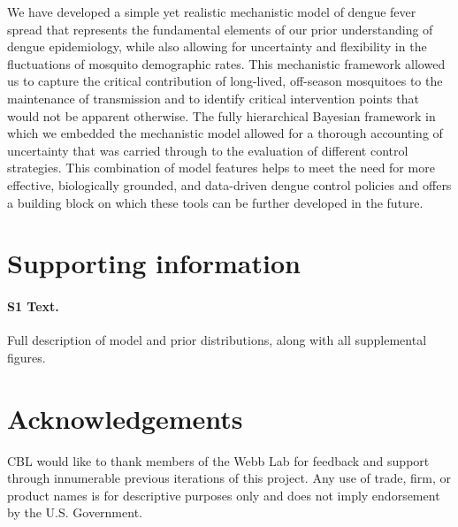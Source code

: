 \documentclass[10pt,letterpaper]{article}
\begin{document}
We have developed a simple yet realistic mechanistic model of dengue fever spread that represents the fundamental elements of our prior understanding of dengue epidemiology, while also allowing for uncertainty and flexibility in the fluctuations of mosquito demographic rates.
This mechanistic framework allowed us to capture the critical contribution of long-lived, off-season mosquitoes to the maintenance of transmission and to identify critical intervention points that would not be apparent otherwise.
The fully hierarchical Bayesian framework in which we embedded the mechanistic model allowed for a thorough accounting of uncertainty that was carried through to the evaluation of different control strategies.
This combination of model features helps to meet the need for more effective, biologically grounded, and data-driven dengue control policies and offers a building block on which these tools can be further developed in the future.

\section*{Supporting information}

\paragraph*{S1 Text.}
\label{S1}
{Full description of model and prior distributions, along with all supplemental figures.}

\section*{Acknowledgements}

CBL would like to thank members of the Webb Lab for feedback and support through innumerable previous iterations of this project.
Any use of trade, firm, or product names is for descriptive purposes only and does not imply endorsement by the U.S. Government.

\nolinenumbers

%
%
% 



\end{document}
